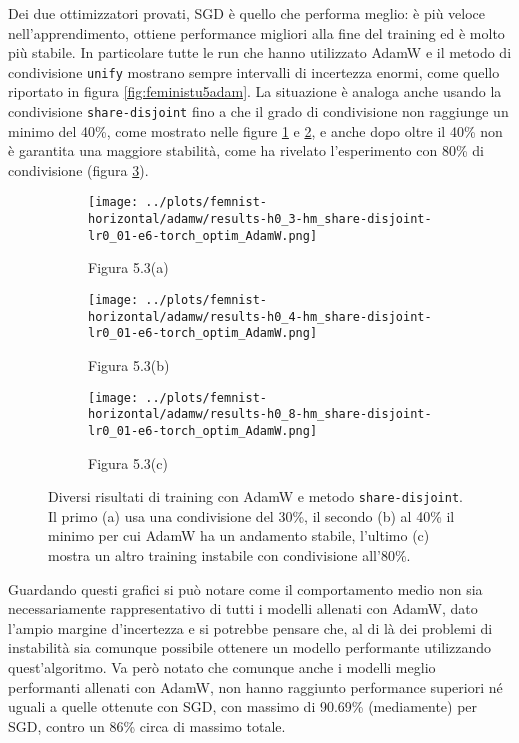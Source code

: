 Dei due ottimizzatori provati, SGD è quello che performa meglio: è più 
veloce nell'apprendimento, ottiene performance migliori alla fine del 
training ed è molto più stabile. In particolare tutte le run che hanno 
utilizzato AdamW e il metodo di condivisione \texttt{unify} mostrano 
sempre intervalli di incertezza enormi, come quello riportato in 
figura \ref{fig:feministu5adam}. La situazione è analoga anche usando 
la condivisione \texttt{share-disjoint} fino a che il grado di 
condivisione non raggiunge un minimo del 40\%, come mostrato nelle 
figure \ref{fig:feminists3adam} e \ref{fig:feminists4adam}, e anche 
dopo oltre il 40\% non è garantita una maggiore stabilità, come ha 
rivelato l'esperimento con 80\% di condivisione (figura \ref{fig:feminists8adam}).
\begin{figure}[htbp]  %
    \centering
    \begin{subfigure}[b]{0.49\textwidth}
        \centering
        \texttt{[image: ../plots/femnist-horizontal/adamw/results-h0\_3-hm\_share-disjoint-lr0\_01-e6-torch\_optim\_AdamW.png]}
        \caption{Figura 5.3(a)}
        \label{fig:feminists3adam}
    \end{subfigure}
    \hfill
    \begin{subfigure}[b]{0.49\textwidth}
        \centering
        \texttt{[image: ../plots/femnist-horizontal/adamw/results-h0\_4-hm\_share-disjoint-lr0\_01-e6-torch\_optim\_AdamW.png]}
        \caption{Figura 5.3(b)}
        \label{fig:feminists4adam}
    \end{subfigure}
    \centering
    \begin{subfigure}[b]{0.49\textwidth}
        \centering
        \texttt{[image: ../plots/femnist-horizontal/adamw/results-h0\_8-hm\_share-disjoint-lr0\_01-e6-torch\_optim\_AdamW.png]}
        \caption{Figura 5.3(c)}
        \label{fig:feminists8adam}
    \end{subfigure}
    
    \caption{
        Diversi risultati di training con AdamW e metodo \texttt{share-disjoint}.
        Il primo (a) usa una condivisione del 30\%, il secondo (b) al 40\%
        il minimo per cui AdamW ha un andamento stabile, l'ultimo (c) 
        mostra un altro training instabile con condivisione all'80\%.
    }
    \label{fig:femnistsxtm}
\end{figure}

Guardando questi grafici si può notare come il comportamento medio non sia 
necessariamente rappresentativo di tutti i modelli allenati con AdamW, dato 
l'ampio margine d'incertezza e si potrebbe pensare che, al di là dei problemi 
di instabilità sia comunque possibile ottenere un modello performante
utilizzando quest'algoritmo. Va però notato che comunque anche i modelli 
meglio performanti allenati con AdamW, non hanno raggiunto performance 
superiori né uguali a quelle ottenute con SGD, con massimo di 90.69\%
(mediamente) per SGD, contro un 86\% circa di massimo totale.

